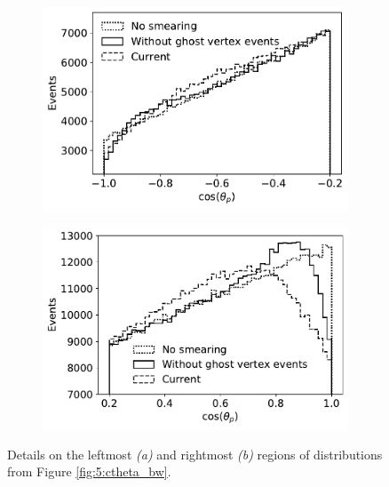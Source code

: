 \begin{figure}[t]
	\centering
	\begin{subfigure}{.45\textwidth}
		\includegraphics[width=\textwidth]{graphics/05-angular_distributions/ctheta_bw_left.pdf}
		\caption{}
		\label{fig:5:ctheta_bw_left}
	\end{subfigure}
	\begin{subfigure}{.45\textwidth}
		\includegraphics[width=\textwidth]{graphics/05-angular_distributions/ctheta_bw_right.pdf}
		\caption{}
		\label{fig:5:ctheta_bw_right}
	\end{subfigure}
	\caption{Details on the leftmost \textit{(a)} and rightmost \textit{(b)} regions of \cthetap distributions from Figure \ref{fig:5:ctheta_bw}.}
	\label{fig:5:ctheta_bw_details}
\end{figure}

